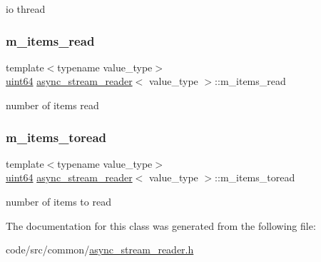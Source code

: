io thread 

\mbox{\label{classasync__stream__reader_a81e8aa844cad035565f9c194a0d3968b}} 
\subsubsection{\texorpdfstring{m\+\_\+items\+\_\+read}{m\_items\_read}}
{\footnotesize\ttfamily template$<$typename value\+\_\+type$>$ \\
\hyperlink{types_8h_a60e8696a4678cd348e991a1f172e53f7}{uint64} \hyperlink{classasync__stream__reader}{async\+\_\+stream\+\_\+reader}$<$ value\+\_\+type $>$\+::m\+\_\+items\+\_\+read\hspace{0.3cm}{\ttfamily [private]}}



number of items read 

\mbox{\label{classasync__stream__reader_acbf67b037e53db6a995079a8e9ffac57}} 
\subsubsection{\texorpdfstring{m\+\_\+items\+\_\+toread}{m\_items\_toread}}
{\footnotesize\ttfamily template$<$typename value\+\_\+type$>$ \\
\hyperlink{types_8h_a60e8696a4678cd348e991a1f172e53f7}{uint64} \hyperlink{classasync__stream__reader}{async\+\_\+stream\+\_\+reader}$<$ value\+\_\+type $>$\+::m\+\_\+items\+\_\+toread\hspace{0.3cm}{\ttfamily [private]}}



number of items to read 



The documentation for this class was generated from the following file\+:\begin{DoxyCompactItemize}
\item 
code/src/common/\hyperlink{async__stream__reader_8h}{async\+\_\+stream\+\_\+reader.\+h}\end{DoxyCompactItemize}
